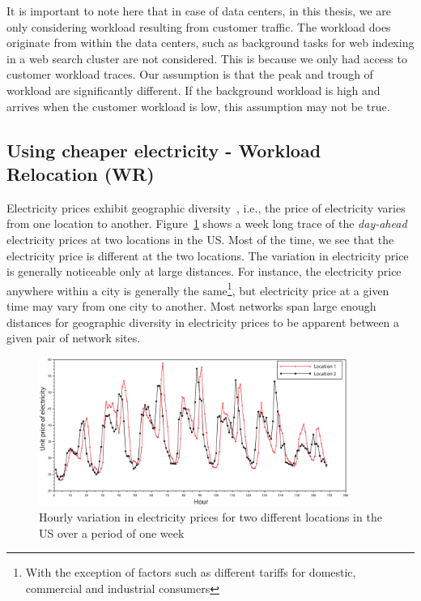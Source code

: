 \begin{enumerate}
It is important to note here that in case of data centers, in this thesis, we are only considering workload resulting from customer traffic. The workload does originate from within the data centers, such as background tasks for web indexing in a web search cluster are not considered. This is because we only had access to customer workload traces. Our assumption is that the peak and trough of workload are significantly different. If the background workload is high and arrives when the customer workload is low, this assumption may not be true. 
\end{enumerate}

\subsection{Using cheaper electricity - Workload Relocation (WR)}
Electricity prices exhibit geographic diversity~\cite{qureshiHotnets,Li:Optimal:TSG:2012,LinInfocom11,serverEnergy,Mazzucco2012415,rao2010,qureshi2009cutting}, i.e., the price of electricity varies from one location to another. Figure~\ref{fig:pricediversity} shows a week long trace of the \textit{day-ahead} electricity prices at two locations in the US. Most of the time, we see that the electricity price is different at the two locations. The variation in electricity price is generally noticeable only at large distances. For instance, the electricity price anywhere within a city is generally the same\footnote{With the exception of factors such as different tariffs for domestic, commercial and industrial consumers}, but electricity price at a given time may vary from one city to another. Most networks span large enough distances for geographic diversity in electricity prices to be apparent between a given pair of network sites. 

\begin{figure}
\centering
\includegraphics[width=0.9\textwidth]{pics/electricitypricediversity.eps}
\caption{Hourly variation in electricity prices for two different locations in the US over a period of one week}
\label{fig:pricediversity}
\end{figure} 

